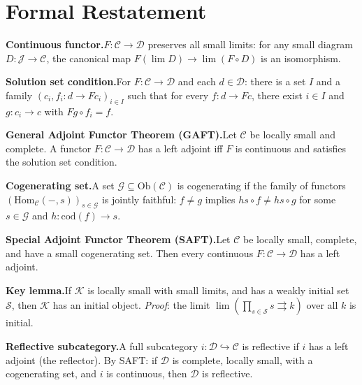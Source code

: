 \section{Formal Restatement}
\label{sec:aft-formal}

\begin{formalrestatement}

\textbf{Continuous functor.}\quad $F: \mathcal{C} \to \mathcal{D}$
preserves all small limits: for any small diagram $D: \mathcal{J} \to
\mathcal{C}$, the canonical map $F(\lim D) \to \lim(F \circ D)$ is an
isomorphism.

\textbf{Solution set condition.}\quad For $F: \mathcal{C} \to \mathcal{D}$
and each $d \in \mathcal{D}$: there is a set $I$ and a family
$(c_i, f_i: d \to Fc_i)_{i \in I}$ such that for every $f: d \to Fc$,
there exist $i \in I$ and $g: c_i \to c$ with $Fg \circ f_i = f$.

\textbf{General Adjoint Functor Theorem (GAFT).}\quad Let $\mathcal{C}$
be locally small and complete. A functor $F: \mathcal{C} \to \mathcal{D}$
has a left adjoint iff $F$ is continuous and satisfies the solution set
condition.

\textbf{Cogenerating set.}\quad A set $\mathcal{G} \subseteq \mathrm{Ob}(\mathcal{C})$
is cogenerating if the family of functors $(\mathrm{Hom}_\mathcal{C}(-,s))_{s \in \mathcal{G}}$
is jointly faithful: $f \neq g$ implies $hs \circ f \neq hs \circ g$
for some $s \in \mathcal{G}$ and $h: \mathrm{cod}(f) \to s$.

\textbf{Special Adjoint Functor Theorem (SAFT).}\quad Let $\mathcal{C}$
be locally small, complete, and have a small cogenerating set. Then every
continuous $F: \mathcal{C} \to \mathcal{D}$ has a left adjoint.

\textbf{Key lemma.}\quad If $\mathcal{K}$ is locally small with small
limits, and has a weakly initial set $\mathcal{S}$, then $\mathcal{K}$
has an initial object. \emph{Proof}: the limit $\lim(\prod_{s \in \mathcal{S}} s
\rightrightarrows k)$ over all $k$ is initial.

\textbf{Reflective subcategory.}\quad A full subcategory $i: \mathcal{D}
\hookrightarrow \mathcal{C}$ is reflective if $i$ has a left adjoint
(the reflector). By SAFT: if $\mathcal{D}$ is complete, locally small,
with a cogenerating set, and $i$ is continuous, then $\mathcal{D}$ is
reflective.

\end{formalrestatement}
